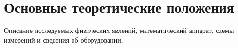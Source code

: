 \section*{Основные теоретические положения}

Описание исследуемых физических явлений, математический аппарат, схемы измерений и сведения об оборудовании.